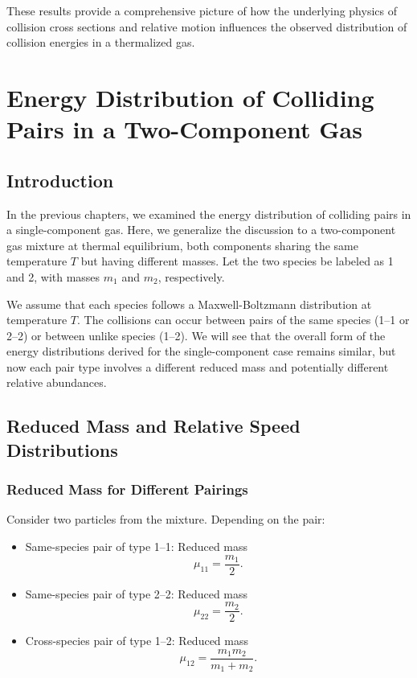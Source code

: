 These results provide a comprehensive picture of how the underlying physics of collision cross sections and relative motion influences the observed distribution of collision energies in a thermalized gas.



\chapter{Energy Distribution of Colliding Pairs in a Two-Component Gas}

\section{Introduction}

In the previous chapters, we examined the energy distribution of colliding pairs in a single-component gas. Here, we generalize the discussion to a two-component gas mixture at thermal equilibrium, both components sharing the same temperature \( T \) but having different masses. Let the two species be labeled as 1 and 2, with masses \( m_1 \) and \( m_2 \), respectively.

We assume that each species follows a Maxwell-Boltzmann distribution at temperature \( T \). The collisions can occur between pairs of the same species (1–1 or 2–2) or between unlike species (1–2). We will see that the overall form of the energy distributions derived for the single-component case remains similar, but now each pair type involves a different reduced mass and potentially different relative abundances.

\section{Reduced Mass and Relative Speed Distributions}

\subsection{Reduced Mass for Different Pairings}

Consider two particles from the mixture. Depending on the pair:

\begin{itemize}
  \item Same-species pair of type 1–1: Reduced mass
    \[
    \mu_{11} = \frac{m_1}{2}.
    \]

  \item Same-species pair of type 2–2: Reduced mass
    \[
    \mu_{22} = \frac{m_2}{2}.
    \]

  \item Cross-species pair of type 1–2: Reduced mass
    \[
    \mu_{12} = \frac{m_1 m_2}{m_1 + m_2}.
    \]
\end{itemize}

